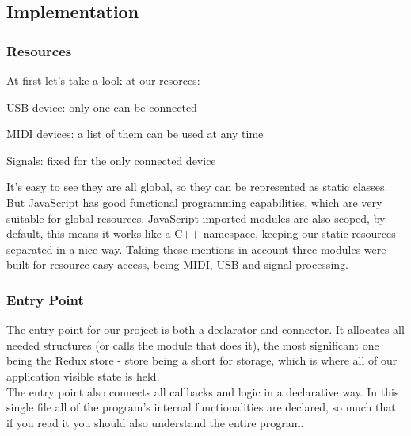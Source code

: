 \subsection{Implementation}

\subsubsection{Resources}
At first let's take a look at our resorces:
\begin{itemlist}
	\item USB device: only one can be connected
	\item MIDI devices: a list of them can be used at any time
	\item Signals: fixed for the only connected device
\end{itemlist}
It's easy to see they are all global, so they can be represented as static classes.
But JavaScript has good functional programming capabilities, which are very
suitable for global resources. JavaScript imported modules are also scoped, by default,
this means it works like a C++ namespace, keeping our static resources separated in
a nice way. Taking these mentions in account three modules were built for resource
easy access, being MIDI, USB and signal processing.

\subsubsection{Entry Point}
The entry point for our project is both a declarator and connector. It allocates
all needed structures (or calls the module that does it), the most significant one
being the Redux store \cite{Redux} - store being a short for storage, which is
where all of our application visible state is held. \\
The entry point also connects all callbacks and logic in a declarative way. In
this single file all of the program's internal functionalities are declared,
so much that if you read it you should also understand the entire program.

